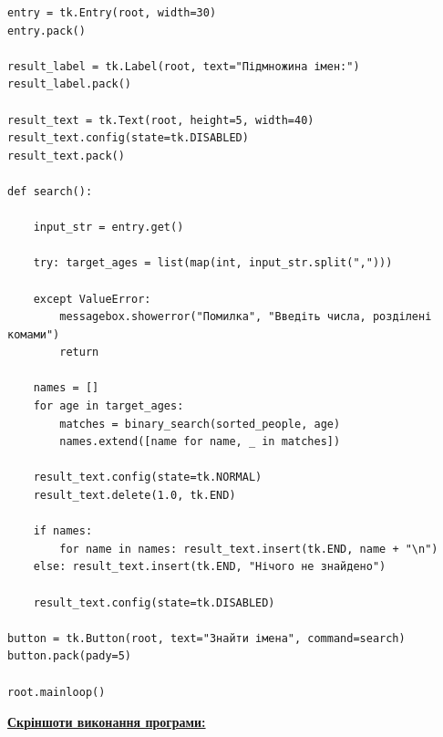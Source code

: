 \documentclass[12pt,a4paper]{article}
\begin{document}
{\begin{verbatim}
entry = tk.Entry(root, width=30)
entry.pack()

result_label = tk.Label(root, text="Підмножина імен:")
result_label.pack()

result_text = tk.Text(root, height=5, width=40)
result_text.config(state=tk.DISABLED)
result_text.pack()

def search():

    input_str = entry.get()

    try: target_ages = list(map(int, input_str.split(",")))

    except ValueError:
        messagebox.showerror("Помилка", "Введіть числа, розділені комами")
        return

    names = []
    for age in target_ages:
        matches = binary_search(sorted_people, age)
        names.extend([name for name, _ in matches])

    result_text.config(state=tk.NORMAL)
    result_text.delete(1.0, tk.END)

    if names:
        for name in names: result_text.insert(tk.END, name + "\n")
    else: result_text.insert(tk.END, "Нічого не знайдено")

    result_text.config(state=tk.DISABLED)

button = tk.Button(root, text="Знайти імена", command=search)
button.pack(pady=5)

root.mainloop()
    \end{verbatim}
}

    \textbf{\underline{Скріншоти виконання програми:}}
\end{document}
